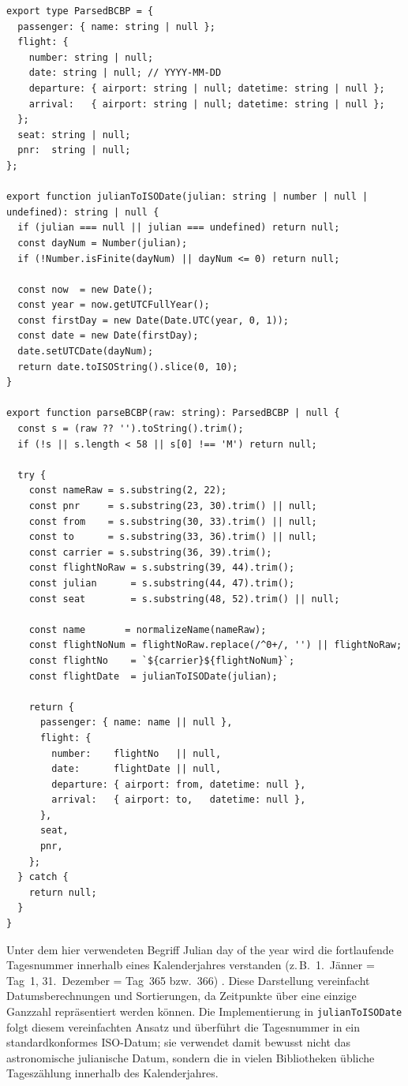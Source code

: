 \begin{lstlisting}[caption={BCBP-Parser in Skyline (\texttt{bcbp.ts})},label={lst:bcbp_parser}]
export type ParsedBCBP = {
  passenger: { name: string | null };
  flight: {
    number: string | null;
    date: string | null; // YYYY-MM-DD
    departure: { airport: string | null; datetime: string | null };
    arrival:   { airport: string | null; datetime: string | null };
  };
  seat: string | null;
  pnr:  string | null;
};

export function julianToISODate(julian: string | number | null | undefined): string | null {
  if (julian === null || julian === undefined) return null;
  const dayNum = Number(julian);
  if (!Number.isFinite(dayNum) || dayNum <= 0) return null;

  const now  = new Date();
  const year = now.getUTCFullYear();
  const firstDay = new Date(Date.UTC(year, 0, 1));
  const date = new Date(firstDay);
  date.setUTCDate(dayNum);
  return date.toISOString().slice(0, 10);
}

export function parseBCBP(raw: string): ParsedBCBP | null {
  const s = (raw ?? '').toString().trim();
  if (!s || s.length < 58 || s[0] !== 'M') return null;

  try {
    const nameRaw = s.substring(2, 22);
    const pnr     = s.substring(23, 30).trim() || null;
    const from    = s.substring(30, 33).trim() || null;
    const to      = s.substring(33, 36).trim() || null;
    const carrier = s.substring(36, 39).trim();
    const flightNoRaw = s.substring(39, 44).trim();
    const julian      = s.substring(44, 47).trim();
    const seat        = s.substring(48, 52).trim() || null;

    const name       = normalizeName(nameRaw);
    const flightNoNum = flightNoRaw.replace(/^0+/, '') || flightNoRaw;
    const flightNo    = `${carrier}${flightNoNum}`;
    const flightDate  = julianToISODate(julian);

    return {
      passenger: { name: name || null },
      flight: {
        number:    flightNo   || null,
        date:      flightDate || null,
        departure: { airport: from, datetime: null },
        arrival:   { airport: to,   datetime: null },
      },
      seat,
      pnr,
    };
  } catch {
    return null;
  }
}
\end{lstlisting}

Unter dem hier verwendeten Begriff \glqq Julian day of the year\grqq{} wird die fortlaufende
Tagesnummer innerhalb eines Kalenderjahres verstanden (z.\,B.\ 1.~Jänner = Tag~1,
31.~Dezember = Tag~365 bzw.~366) \cite{wikipediaJulianDay}.
Diese Darstellung vereinfacht Datumsberechnungen und Sortierungen, da Zeitpunkte über eine
einzige Ganzzahl repräsentiert werden können.
Die Implementierung in \texttt{julianToISODate} folgt diesem vereinfachten Ansatz und
überführt die Tagesnummer in ein standardkonformes ISO-Datum; sie verwendet damit bewusst
nicht das astronomische julianische Datum, sondern die in vielen Bibliotheken übliche
Tageszählung innerhalb des Kalenderjahres.

